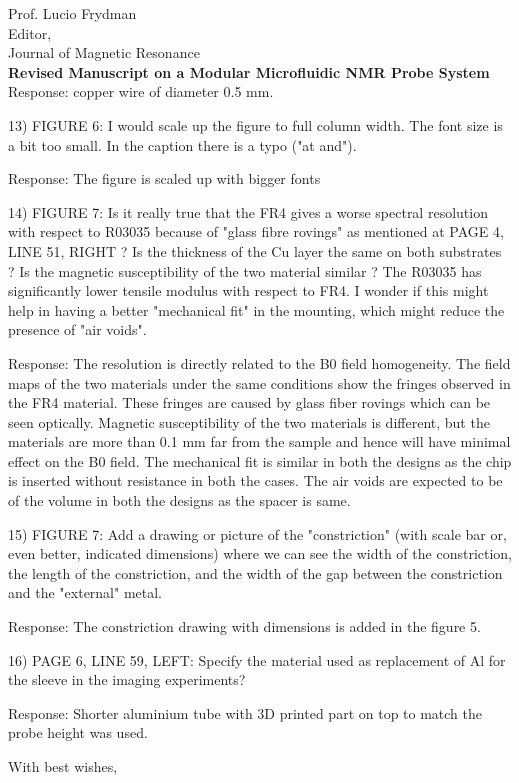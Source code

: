 \documentclass{mu-soton-letter}
\begin{document}
\begin{letter}{Prof. Lucio Frydman\\
  Editor,\\
  Journal of Magnetic Resonance\\[2cm]
  \textbf{Revised Manuscript on a Modular Microfluidic NMR Probe System}}
Response: copper wire of diameter 0.5 mm.

13) FIGURE 6: I would scale up the figure to full column width. The font size is a bit too small. In the caption there is a typo ("at and").

Response: The figure is scaled up with bigger fonts

14) FIGURE 7: Is it really true that the FR4 gives a worse spectral resolution with respect to R03035 because of "glass fibre rovings" as mentioned at PAGE 4, LINE 51, RIGHT ? Is the thickness of the Cu layer the same on both substrates ? Is the magnetic susceptibility of the two material similar ? The R03035 has significantly lower tensile modulus with respect to FR4. I wonder if this might help in having a better "mechanical fit" in the mounting, which might reduce the presence of "air voids".

Response: The resolution is directly related to the B0 field homogeneity. The field maps of the two materials under the same conditions show the fringes observed in the FR4 material. These fringes are caused by glass fiber rovings which can be seen optically. Magnetic susceptibility of the two materials is different, but the materials are more than 0.1 mm far from the sample and hence will have minimal effect on the B0 field. The mechanical fit is similar in both the designs as the chip is inserted without resistance in both the cases. The air voids are expected to be of the volume in both the designs as the spacer is same.

15) FIGURE 7: Add a drawing or picture of the "constriction" (with scale bar or, even better, indicated dimensions) where we can see the width of the constriction, the length of the constriction, and the width of the gap between the constriction and the "external" metal.

Response: The constriction drawing with dimensions is added in the figure 5.

16) PAGE 6, LINE 59, LEFT: Specify the material used as replacement of Al for the sleeve in the imaging experiments?

Response: Shorter aluminium tube with 3D printed part on top to match the probe height was used.





\closing{With best wishes,}

\end{letter}
\end{document}
